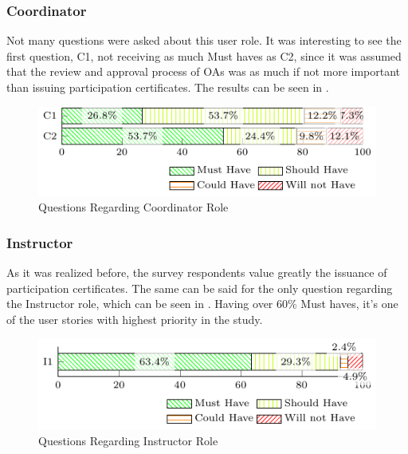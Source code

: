 \subsubsection{Coordinator}\label{sec:survey-quant-coordinator}

Not many questions were asked about this user role. It was interesting to see the first question, C1, not receiving as much Must haves as C2, since it was assumed that the review and approval process of \acp{OA} was as much if not more important than issuing participation certificates. The results can be seen in .

\begin{figure}[!htb]
  \caption{Questions Regarding Coordinator Role}\label{fig:coordinator-questions}
  \begin{center}
    \includegraphics[width=13cm]{img/5-questions-coordinator.pdf}
  \end{center}
\end{figure}

\subsubsection{Instructor}\label{sec:survey-quant-instructor}

As it was realized before, the survey respondents value greatly the issuance of participation certificates. The same can be said for the only question regarding the Instructor role, which can be seen in . Having over 60\% Must haves, it's one of the user stories with highest priority in the study.

\begin{figure}[!htb]
  \caption{Questions Regarding Instructor Role}\label{fig:instructor-questions}
  \begin{center}
    \includegraphics[width=13cm]{img/5-questions-instructor.pdf}
  \end{center}
\end{figure}

